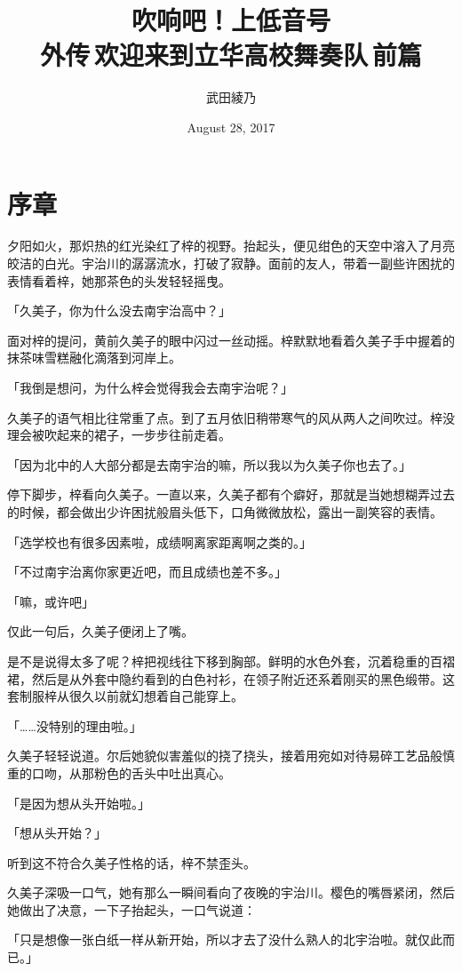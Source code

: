 \documentclass[UTF8]{ctexart}
\title{吹响吧！上低音号\\ \Large{外传\,欢迎来到立华高校舞奏队\,前篇}}
\date{August 28, 2017}
\author{武田綾乃}
\begin{document}
    \maketitle
    \tableofcontents
    \setcounter{secnumdepth}{-2}
    \section{序章}
    \setcounter{secnumdepth}{3}
    夕阳如火，那炽热的红光染红了梓的视野。抬起头，便见绀色的天空中溶入了月亮皎洁的白光。宇治川的潺潺流水，打破了寂静。面前的友人，带着一副些许困扰的表情看着梓，她那茶色的头发轻轻摇曳。

    「久美子，你为什么没去南宇治高中？」

    面对梓的提问，黄前久美子的眼中闪过一丝动摇。梓默默地看着久美子手中握着的抹茶味雪糕融化滴落到河岸上。

    「我倒是想问，为什么梓会觉得我会去南宇治呢？」

    久美子的语气相比往常重了点。到了五月依旧稍带寒气的风从两人之间吹过。梓没理会被吹起来的裙子，一步步往前走着。

    「因为北中的人大部分都是去南宇治的嘛，所以我以为久美子你也去了。」

    停下脚步，梓看向久美子。一直以来，久美子都有个癖好，那就是当她想糊弄过去的时候，都会做出少许困扰般眉头低下，口角微微放松，露出一副笑容的表情。

    「选学校也有很多因素啦，成绩啊离家距离啊之类的。」

    「不过南宇治离你家更近吧，而且成绩也差不多。」

    「嘛，或许吧」

    仅此一句后，久美子便闭上了嘴。

    是不是说得太多了呢？梓把视线往下移到胸部。鲜明的水色外套，沉着稳重的百褶裙，然后是从外套中隐约看到的白色衬衫，在领子附近还系着刚买的黑色缎带。这套制服梓从很久以前就幻想着自己能穿上。

    「……没特别的理由啦。」

    久美子轻轻说道。尔后她貌似害羞似的挠了挠头，接着用宛如对待易碎工艺品般慎重的口吻，从那粉色的舌头中吐出真心。

    「是因为想从头开始啦。」

    「想从头开始？」

    听到这不符合久美子性格的话，梓不禁歪头。

    久美子深吸一口气，她有那么一瞬间看向了夜晚的宇治川。樱色的嘴唇紧闭，然后她做出了决意，一下子抬起头，一口气说道：

    「只是想像一张白纸一样从新开始，所以才去了没什么熟人的北宇治啦。就仅此而已。」
\end{document}
